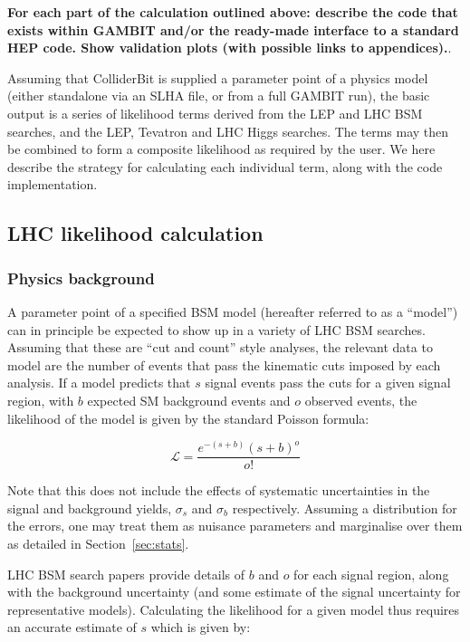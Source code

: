 \textbf{For each part of the calculation outlined above: describe the code that exists within GAMBIT and/or the ready-made interface to a standard HEP code. Show validation plots (with possible links to appendices).}.

Assuming that ColliderBit is supplied a parameter point of a physics model (either standalone via an SLHA file, or from a full GAMBIT run), the basic output is a series of likelihood terms derived from the LEP and LHC BSM searches, and the LEP, Tevatron and LHC Higgs searches. The terms may then be combined to form a composite likelihood as required by the user. We here describe the strategy for calculating each individual term, along with the code implementation. 

\subsection{LHC likelihood calculation}
\subsubsection{Physics background}
A parameter point of a specified BSM model (hereafter referred to as a ``model'') can in principle be expected to show up in a variety of LHC BSM searches. Assuming that these are ``cut and count'' style analyses, the relevant data to model are the number of events that pass the kinematic cuts imposed by each analysis. If a model predicts that $s$ signal events pass the cuts for a given signal region, with $b$ expected SM background events and $o$ observed events, the likelihood of the model is given by the standard Poisson formula:

\begin{equation}
\mathcal{L}=\frac{e^{-(s+b)}(s+b)^o}{o!}
\end{equation}

Note that this does not include the effects of systematic uncertainties in the signal and background yields, $\sigma_s$ and $\sigma_b$ respectively. Assuming a distribution for the errors, one may treat them as nuisance parameters and marginalise over them as detailed in Section~\ref{sec:stats}.

LHC BSM search papers provide details of $b$ and $o$ for each signal region, along with the background uncertainty (and some estimate of the signal uncertainty for representative models). Calculating the likelihood for a given model thus requires an accurate estimate of $s$ which is given by:

